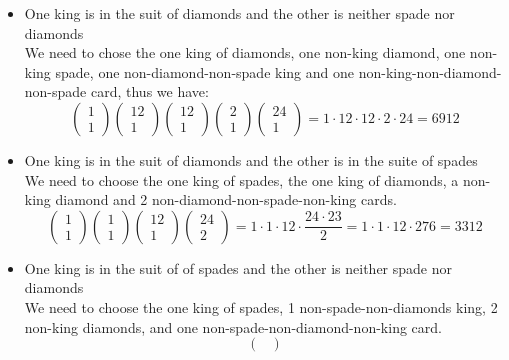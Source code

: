 \documentclass{article}
\begin{document}
\begin{itemize}
    \item One king is in the suit of diamonds and the other is neither spade nor diamonds\\
    We need to chose the one king of diamonds, one non-king diamond, one non-king spade, one non-diamond-non-spade king and one non-king-non-diamond-non-spade card, thus we have: 
    $$\begin{pmatrix}
        1\\1
    \end{pmatrix}\begin{pmatrix}
        12\\1
    \end{pmatrix}\begin{pmatrix}
        12\\1
    \end{pmatrix}\begin{pmatrix}
        2\\1
    \end{pmatrix}\begin{pmatrix}
        24\\1
    \end{pmatrix}=1\cdot 12 \cdot 12 \cdot 2 \cdot 24=6912$$
    \item One king is in the suit of diamonds and the other is in the suite of spades\\
    We need to choose the one king of spades, the one king of diamonds, a non-king diamond and 2 non-diamond-non-spade-non-king cards.
    $$\begin{pmatrix}
        1\\1
    \end{pmatrix}\begin{pmatrix}
        1\\1
    \end{pmatrix}\begin{pmatrix}
        12\\1
    \end{pmatrix}\begin{pmatrix}
        24\\2
    \end{pmatrix}=1\cdot 1\cdot 12\cdot \frac{24\cdot 23}{2}=1\cdot 1\cdot 12\cdot 276=3312$$
    \item One king is in the suit of of spades and the other is neither spade nor diamonds\\
    We need to choose the one king of spades, 1 non-spade-non-diamonds king, 2 non-king diamonds, and one non-spade-non-diamond-non-king card.$$\begin{pmatrix}

\end{pmatrix}$$
\end{itemize}
\end{document}
